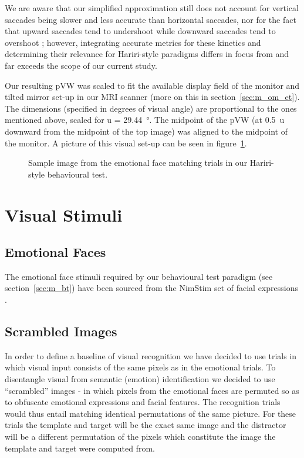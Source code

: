 	We are aware that our simplified approximation still does not account for vertical saccades being slower\cite{TerryBahill1975} and less accurate\cite{Collewijn1988} than horizontal saccades, 
	nor for the fact that upward saccades tend to undershoot while downward saccades tend to overshoot \cite{Collewijn1988};
	however, integrating accurate metrics for these kinetics and determining their relevance for Hariri-style paradigms differs in focus from and far exceeds the scope of our current study.
	
	Our resulting pVW was scaled to fit the available display field of the monitor and tilted mirror set-up in our MRI scanner (more on this in section~\ref{sec:m_om_et}).
	The dimensions (specified in degrees of visual angle) are proportional to the ones mentioned above, scaled for u = \SI{29.44}{\degree}.
	The midpoint of the pVW (at \SI{0.5}{u} downward from the midpoint of the top image) was aligned to the midpoint of the monitor.
	A picture of this visual set-up can be seen in figure~\ref{fig:m_b_2}.
	
	\begin{figure}[!h]
	    \caption{Sample image from the emotional face matching trials in our Hariri-style behavioural test.}
	    \label{fig:m_b_2}
	\end{figure}
		    
    \section{Visual Stimuli}
	\subsection{Emotional Faces}\label{sec:m_vs_ef}
	    The emotional face stimuli required by our behavioural test paradigm (see section~\ref{sec:m_bt}) have been sourced from the NimStim set of facial expressions \cite{Tottenham2009}.
	\subsection{Scrambled Images}\label{sec:m_vs_si}
	    In order to define a baseline of visual recognition we have decided to use trials in which visual input consists of the same pixels as in the emotional trials. 
	    To disentangle visual from semantic (emotion) identification we decided to use “scrambled” images - in which pixels from the emotional faces are permuted so as to obfuscate emotional expressions and facial features.
	    The recognition trials would thus entail matching identical permutations of the same picture.
	    For these trials the template and target will be the exact same image and the distractor will be a different permutation of the pixels which constitute the image the template and target were computed from. 
	    

